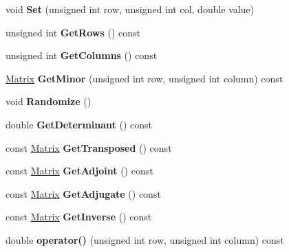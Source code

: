 \begin{DoxyCompactItemize}
\item 
\hypertarget{classdfv_1_1Matrix_a3172608cf178222b05aa6e9d49884947}{void {\bfseries \-Set} (unsigned int row, unsigned int col, double value)}\label{classdfv_1_1Matrix_a3172608cf178222b05aa6e9d49884947}

\item 
\hypertarget{classdfv_1_1Matrix_a348f25a5ba52132128db9bd21d9edf7d}{unsigned int {\bfseries \-Get\-Rows} () const }\label{classdfv_1_1Matrix_a348f25a5ba52132128db9bd21d9edf7d}

\item 
\hypertarget{classdfv_1_1Matrix_aaf40c723521a5c12c87e238eedef22da}{unsigned int {\bfseries \-Get\-Columns} () const }\label{classdfv_1_1Matrix_aaf40c723521a5c12c87e238eedef22da}

\item 
\hypertarget{classdfv_1_1Matrix_a6d41ded1233ab2445bfac075fdddf831}{\hyperlink{classdfv_1_1Matrix}{\-Matrix} {\bfseries \-Get\-Minor} (unsigned int row, unsigned int column) const }\label{classdfv_1_1Matrix_a6d41ded1233ab2445bfac075fdddf831}

\item 
\hypertarget{classdfv_1_1Matrix_a13de1afb3cce2f2996323487b8d2a5af}{void {\bfseries \-Randomize} ()}\label{classdfv_1_1Matrix_a13de1afb3cce2f2996323487b8d2a5af}

\item 
\hypertarget{classdfv_1_1Matrix_a91ced62f8f1c042ad031ca8282d2abd8}{double {\bfseries \-Get\-Determinant} () const }\label{classdfv_1_1Matrix_a91ced62f8f1c042ad031ca8282d2abd8}

\item 
\hypertarget{classdfv_1_1Matrix_a1fcc2461164d91e0742c9685517a0a48}{const \hyperlink{classdfv_1_1Matrix}{\-Matrix} {\bfseries \-Get\-Transposed} () const }\label{classdfv_1_1Matrix_a1fcc2461164d91e0742c9685517a0a48}

\item 
\hypertarget{classdfv_1_1Matrix_ad3477aa854d8803dca2a943cc6629ba9}{const \hyperlink{classdfv_1_1Matrix}{\-Matrix} {\bfseries \-Get\-Adjoint} () const }\label{classdfv_1_1Matrix_ad3477aa854d8803dca2a943cc6629ba9}

\item 
\hypertarget{classdfv_1_1Matrix_a4c928f3296f66d4ac511cb95c3915cf8}{const \hyperlink{classdfv_1_1Matrix}{\-Matrix} {\bfseries \-Get\-Adjugate} () const }\label{classdfv_1_1Matrix_a4c928f3296f66d4ac511cb95c3915cf8}

\item 
\hypertarget{classdfv_1_1Matrix_a7937ed593017bb9f7ffe5ed5ea4279f8}{const \hyperlink{classdfv_1_1Matrix}{\-Matrix} {\bfseries \-Get\-Inverse} () const }\label{classdfv_1_1Matrix_a7937ed593017bb9f7ffe5ed5ea4279f8}

\item 
\hypertarget{classdfv_1_1Matrix_a7167e74a4fe7d178aaa794e00d96900a}{double {\bfseries operator()} (unsigned int row, unsigned int column) const }\label{classdfv_1_1Matrix_a7167e74a4fe7d178aaa794e00d96900a}

\end{DoxyCompactItemize}
